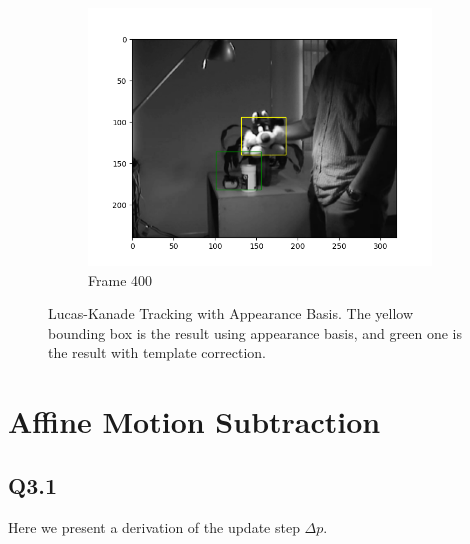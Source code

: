 \documentclass{article} %
\begin{document}
\begin{figure}[H]
\begin{subfigure}[b]{0.30\textwidth}
            \includegraphics[width=\textwidth]{q2,3_frame400.png}
            \caption{Frame 400}
        \end{subfigure}
        \caption{Lucas-Kanade Tracking with Appearance Basis. The yellow bounding box is the result using appearance basis, and green one is the result with template correction.}
    \end{figure}

    \section{Affine Motion Subtraction}

    \subsection*{Q3.1}
    Here we present a derivation of the update step $\Delta p$.
    \medskip
\end{document}
